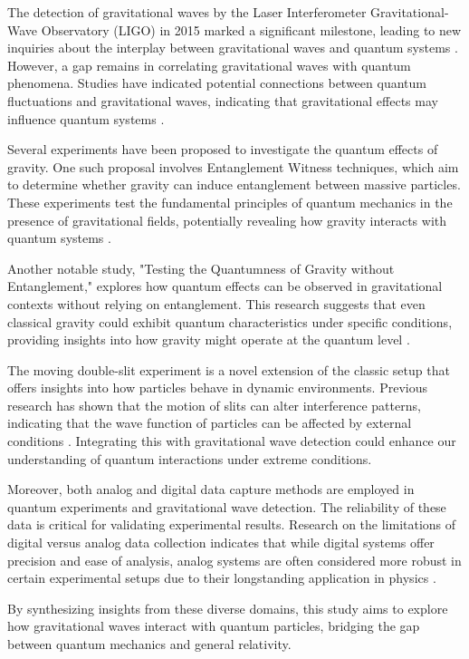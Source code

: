 \documentclass{article}
\begin{document}
The detection of gravitational waves by the Laser Interferometer Gravitational-Wave Observatory (LIGO) in 2015 marked a significant milestone, leading to new inquiries about the interplay between gravitational waves and quantum systems \cite{abbott2016}. However, a gap remains in correlating gravitational waves with quantum phenomena. Studies have indicated potential connections between quantum fluctuations and gravitational waves, indicating that gravitational effects may influence quantum systems \cite{maldacena2013}.

Several experiments have been proposed to investigate the quantum effects of gravity. One such proposal involves Entanglement Witness techniques, which aim to determine whether gravity can induce entanglement between massive particles. These experiments test the fundamental principles of quantum mechanics in the presence of gravitational fields, potentially revealing how gravity interacts with quantum systems \cite{rangamani2017}.

Another notable study, "Testing the Quantumness of Gravity without Entanglement," explores how quantum effects can be observed in gravitational contexts without relying on entanglement. This research suggests that even classical gravity could exhibit quantum characteristics under specific conditions, providing insights into how gravity might operate at the quantum level \cite{oppenheim2021}.

The moving double-slit experiment is a novel extension of the classic setup that offers insights into how particles behave in dynamic environments. Previous research has shown that the motion of slits can alter interference patterns, indicating that the wave function of particles can be affected by external conditions \cite{scully1999}. Integrating this with gravitational wave detection could enhance our understanding of quantum interactions under extreme conditions.

Moreover, both analog and digital data capture methods are employed in quantum experiments and gravitational wave detection. The reliability of these data is critical for validating experimental results. Research on the limitations of digital versus analog data collection indicates that while digital systems offer precision and ease of analysis, analog systems are often considered more robust in certain experimental setups due to their longstanding application in physics \cite{klyshko1988}.

By synthesizing insights from these diverse domains, this study aims to explore how gravitational waves interact with quantum particles, bridging the gap between quantum mechanics and general relativity.
\end{document}
